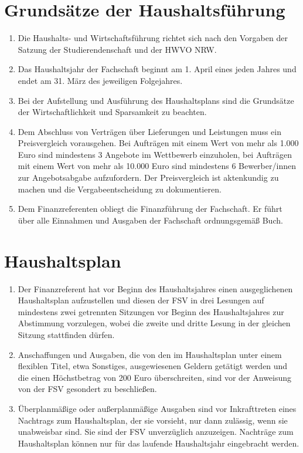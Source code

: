 \documentclass{article}
\begin{document}
\section{Grundsätze der Haushaltsführung}
\begin{enumerate}[(1)]
    \item Die Haushalts- und Wirtschaftsführung richtet sich nach den Vorgaben der Satzung der Studierendenschaft und der HWVO NRW.
    \item Das Haushaltsjahr der Fachschaft beginnt am 1. April eines jeden Jahres und endet am 31. März des jeweiligen Folgejahres.
    \item Bei der Aufstellung und Ausführung des Haushaltsplans sind die Grundsätze der Wirtschaftlichkeit und Sparsamkeit zu beachten.
    \item Dem Abschluss von Verträgen über Lieferungen und Leistungen muss ein Preisvergleich vorausgehen. Bei Aufträgen mit einem Wert von mehr als 1.000 Euro sind mindestens 3 Angebote im Wettbewerb einzuholen, bei Aufträgen mit einem Wert von mehr als 10.000 Euro sind mindestens 6 Bewerber/innen zur Angebotsabgabe aufzufordern. Der Preisvergleich ist aktenkundig zu machen und die Vergabeentscheidung zu dokumentieren.
    \item Dem Finanzreferenten obliegt die Finanzführung der Fachschaft. Er führt über alle Einnahmen und Ausgaben der Fachschaft ordnungsgemäß Buch.
\end{enumerate}

\section{Haushaltsplan}
\begin{enumerate}[(1)]
    \item Der Finanzreferent hat vor Beginn des Haushaltsjahres einen ausgeglichenen Haushaltsplan aufzustellen und diesen der FSV in drei Lesungen auf mindestens zwei getrennten Sitzungen vor Beginn des Haushaltsjahres zur Abstimmung vorzulegen, wobei die zweite und dritte Lesung in der gleichen Sitzung stattfinden dürfen.
    \item Anschaffungen und Ausgaben, die von den im Haushaltsplan unter einem flexiblen Titel, etwa \glqq Sonstiges\grqq, ausgewiesenen Geldern getätigt werden und die einen Höchstbetrag von 200 Euro überschreiten, sind vor der Anweisung von der FSV gesondert zu beschließen.
    \item Überplanmäßige oder außerplanmäßige Ausgaben sind vor Inkrafttreten eines Nachtrags zum Haushaltsplan, der sie vorsieht, nur dann zulässig, wenn sie unabweisbar sind. Sie sind der FSV unverzüglich anzuzeigen. Nachträge zum Haushaltsplan können nur für das laufende Haushaltsjahr eingebracht werden.
\end{enumerate}
\end{document}
